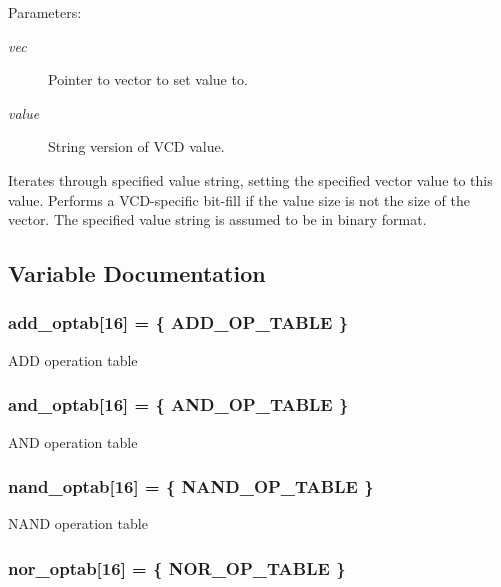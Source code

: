 \begin{Desc}
\item[Parameters: ]\par
\begin{description}
\item[{\em 
vec}]Pointer to vector to set value to. \item[{\em 
value}]String version of VCD value.\end{description}
\end{Desc}
Iterates through specified value string, setting the specified vector value to this value. Performs a VCD-specific bit-fill if the value size is not the size of the vector. The specified value string is assumed to be in binary format. 

\subsection{Variable Documentation}
\subsubsection{ add\_\-optab[16] = \{ ADD\_\-OP\_\-TABLE \}}\label{vector_8c_a6}


ADD operation table 
\subsubsection{ and\_\-optab[16] = \{ AND\_\-OP\_\-TABLE \}}\label{vector_8c_a1}


AND operation table 
\subsubsection{ nand\_\-optab[16] = \{ NAND\_\-OP\_\-TABLE \}}\label{vector_8c_a3}


NAND operation table 
\subsubsection{ nor\_\-optab[16] = \{ NOR\_\-OP\_\-TABLE \}}\label{vector_8c_a4}


